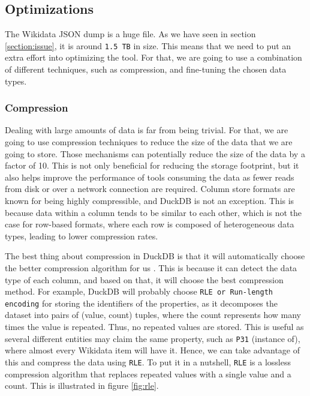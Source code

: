 \label{section:optimizations}
\subsection{Optimizations}

The Wikidata JSON dump is a huge file. As we have seen in section \ref{section:issue}, it is around \texttt{1.5 TB} in size. This means that we need to put an extra effort into optimizing the tool. For that, we are going to use a combination of different techniques, such as compression, and fine-tuning the chosen data types.

\subsubsection{Compression}

Dealing with large amounts of data is far from being trivial. For that, we are going to use compression techniques to reduce the size of the data that we are going to store. Those mechanisms can potentially reduce the size of the data by a factor of 10. This is not only beneficial for reducing the storage footprint, but it also helps improve the performance of tools consuming the data as fewer reads from disk or over a network connection are required. Column store formats are known for being highly compressible, and DuckDB is not an exception. This is because data within a column tends to be similar to each other, which is not the case for row-based formats, where each row is composed of heterogeneous data types, leading to lower compression rates.

The best thing about compression in DuckDB is that it will automatically choose the better compression algorithm for us \cite{Raasveldt_2022}. This is because it can detect the data type of each column, and based on that, it will choose the best compression method. For example, DuckDB will probably choose \texttt{RLE or Run-length encoding} for storing the identifiers of the properties, as it decomposes the dataset into pairs of (value, count) tuples, where the count represents how many times the value is repeated. Thus, no repeated values are stored. This is useful as several different entities may claim the same property, such as \texttt{P31} (instance of), where almost every Wikidata item will have it. Hence, we can take advantage of this and compress the data using \texttt{RLE}. To put it in a nutshell, \texttt{RLE} is a lossless compression algorithm that replaces repeated values with a single value and a count. This is illustrated in figure \ref{fig:rle}.

